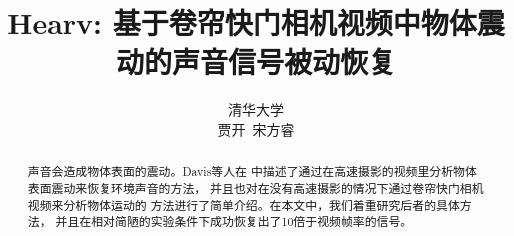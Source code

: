 \documentclass[a4paper]{article}
\title{Hearv: 基于卷帘快门相机视频中物体震动的声音信号被动恢复}
\author{清华大学\\贾开~宋方睿}
\date{}
\numberwithin{equation}{section}
\begin{document}
\maketitle
\begin{abstract}
    声音会造成物体表面的震动。Davis等人在\cite{Davis2014VisualMic}
    中描述了通过在高速摄影的视频里分析物体表面震动来恢复环境声音的方法，
    并且也对在没有高速摄影的情况下通过卷帘快门相机视频来分析物体运动的
    方法进行了简单介绍。在本文中，我们着重研究后者的具体方法，
    并且在相对简陋的实验条件下成功恢复出了10倍于视频帧率的信号。
\end{abstract}
\tableofcontents





\printbibliography
\end{document}
